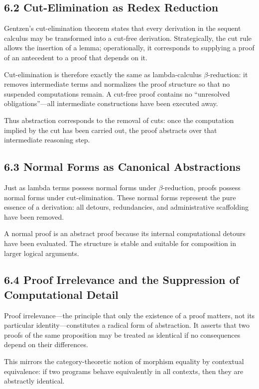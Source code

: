 \documentclass[11pt,letterpaper]{article}
\begin{document}
\subsection{6.2 Cut-Elimination as Redex Reduction}

Gentzen’s cut-elimination theorem states that every derivation in the sequent calculus may be transformed into a cut-free derivation. Strategically, the cut rule allows the insertion of a lemma; operationally, it corresponds to supplying a proof of an antecedent to a proof that depends on it.

Cut-elimination is therefore exactly the same as lambda-calculus \(\beta\)-reduction: it removes intermediate terms and normalizes the proof structure so that no suspended computations remain. A cut-free proof contains no ``unresolved obligations''—all intermediate constructions have been executed away.

Thus abstraction corresponds to the removal of cuts: once the computation implied by the cut has been carried out, the proof abstracts over that intermediate reasoning step.

\subsection{6.3 Normal Forms as Canonical Abstractions}

Just as lambda terms possess normal forms under \(\beta\)-reduction, proofs possess normal forms under cut-elimination. These normal forms represent the pure essence of a derivation: all detours, redundancies, and administrative scaffolding have been removed.

A normal proof is an abstract proof because its internal computational detours have been evaluated. The structure is stable and suitable for composition in larger logical arguments.

\subsection{6.4 Proof Irrelevance and the Suppression of Computational Detail}

Proof irrelevance—the principle that only the existence of a proof matters, not its particular identity—constitutes a radical form of abstraction. It asserts that two proofs of the same proposition may be treated as identical if no consequences depend on their differences.

This mirrors the category-theoretic notion of morphism equality by contextual equivalence: if two programs behave equivalently in all contexts, then they are abstractly identical.
\end{document}
